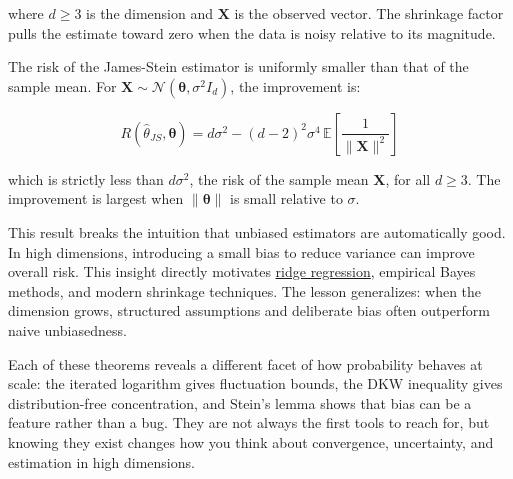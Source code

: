 \documentclass[11pt]{article}
\begin{document}
where \(d \geq 3\) is the dimension and \(\mathbf{X}\) is the observed vector. The shrinkage factor pulls the estimate toward zero when the data is noisy relative to its magnitude.

The risk of the James-Stein estimator is uniformly smaller than that of the sample mean. For \(\mathbf{X} \sim \mathcal{N}(\boldsymbol{\theta}, \sigma^2 I_d)\), the improvement is:

\[R(\hat{\theta}_{JS}, \boldsymbol{\theta}) = d\sigma^2 - (d-2)^2 \sigma^4 \, \mathbb{E}\left[\frac{1}{\|\mathbf{X}\|^2}\right]\]

which is strictly less than \(d\sigma^2\), the risk of the sample mean \(\mathbf{X}\), for all \(d \geq 3\). The improvement is largest when \(\|\boldsymbol{\theta}\|\) is small relative to \(\sigma\).

This result breaks the intuition that unbiased estimators are automatically good. In high dimensions, introducing a small bias to reduce variance can improve overall risk. This insight directly motivates \href{https://en.wikipedia.org/wiki/Tikhonov_regularization}{ridge regression}, empirical Bayes methods, and modern shrinkage techniques. The lesson generalizes: when the dimension grows, structured assumptions and deliberate bias often outperform naive unbiasedness.

\publicationdivider

Each of these theorems reveals a different facet of how probability behaves at scale: the iterated logarithm gives fluctuation bounds, the DKW inequality gives distribution-free concentration, and Stein's lemma shows that bias can be a feature rather than a bug. They are not always the first tools to reach for, but knowing they exist changes how you think about convergence, uncertainty, and estimation in high dimensions.
\end{document}
